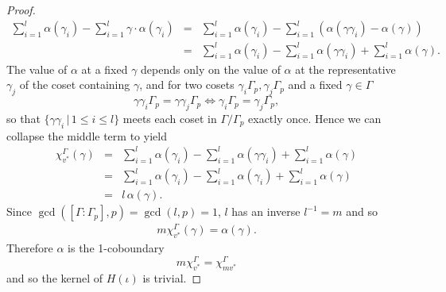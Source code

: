 \begin{proof}
\begin{eqnarray*}
	 \sum_{i = 1}^l\alpha(\gamma_i) - \sum_{i = 1}^l \gamma\cdot \alpha(\gamma_i) 
	&=& \sum_{i = 1}^l\alpha(\gamma_i) - \sum_{i = 1}^l \left(\alpha(\gamma\gamma_i) - \alpha(\gamma) \right)\\
	&=& \sum_{i = 1}^l\alpha(\gamma_i) - \sum_{i = 1}^l \alpha(\gamma\gamma_i) +\sum_{i = 1}^l \alpha(\gamma).
\end{eqnarray*}
The value of $\alpha$ at a fixed $\gamma$ depends only on the value of $\alpha$ at the representative $\gamma_j$ of the coset containing $\gamma$, and for two cosets $\gamma_i \Gamma_p, \gamma_j \Gamma_p$ and a fixed $\gamma \in \Gamma$
\begin{displaymath}
  \gamma \gamma_i \Gamma_p = \gamma \gamma_j \Gamma_p \Leftrightarrow \gamma_i \Gamma_p = \gamma_j \Gamma_p,
\end{displaymath}
so that $\{\gamma \gamma_i \,|\, 1 \leq i \leq l\}$ meets each coset in $\Gamma/\Gamma_p$ exactly once. Hence we can collapse the middle term to yield
\begin{eqnarray*}
	\chi_{v^*}^\Gamma(\gamma) 
	&=& \sum_{i = 1}^l\alpha(\gamma_i) - \sum_{i = 1}^l \alpha(\gamma\gamma_i) +\sum_{i = 1}^l \alpha(\gamma)\\
	&=& \sum_{i = 1}^l\alpha(\gamma_i) - \sum_{i = 1}^l \alpha(\gamma_i) +\sum_{i = 1}^l \alpha(\gamma) \\
	&=& l\, \alpha(\gamma).
\end{eqnarray*}
Since $\gcd([\Gamma:\Gamma_p], p) = \gcd(l,p) = 1$, $l$ has an inverse $l^{-1} = m$ and so
\begin{eqnarray*}
	m\chi_{v^*}^\Gamma(\gamma) = \alpha(\gamma).
\end{eqnarray*}
Therefore $\alpha$ is the 1-coboundary
\begin{displaymath}
  m\chi_{v^*}^\Gamma = \chi_{mv^*}^\Gamma
\end{displaymath}
and so the kernel of $H(\iota)$ is trivial.
\end{proof}

